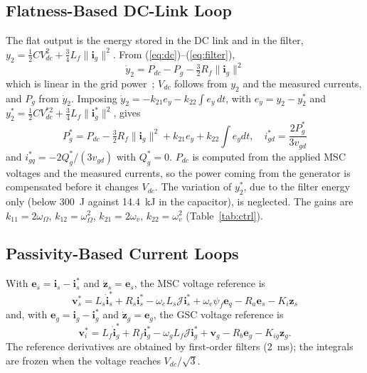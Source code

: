 \documentclass[conference]{IEEEtran}
\newcommand{\bv}[1]{\mathbf{#1}}
\newcommand{\Jm}{\boldsymbol{\mathcal{J}}}
\begin{document}
\subsection{Flatness-Based DC-Link Loop}
The flat output is the energy stored in the DC link and in the filter,
$y_2=\frac12CV_{dc}^2+\frac34L_f\|\bv{i}_g\|^2$. From (\ref{eq:dc})--(\ref{eq:filter}),
\begin{equation}
\dot y_2 = P_{dc} - P_g - \tfrac32R_f\|\bv{i}_g\|^2
\label{eq:y2}
\end{equation}
which is linear in the grid power~\cite{thounthong2010}; $V_{dc}$ follows from $y_2$ and the measured
currents, and $P_g$ from $\dot y_2$. Imposing $\dot y_2=-k_{21}e_y-k_{22}\int e_y\,dt$, with
$e_y=y_2-y_2^*$ and $y_2^*=\frac12CV_{dc}^{*2}+\frac34L_f\|\bv{i}_g^*\|^2$, gives
\begin{equation}
P_g^* = P_{dc} - \tfrac32R_f\|\bv{i}_g\|^2 + k_{21}e_y + k_{22}\!\int\! e_y dt,\quad
i_{gd}^*=\frac{2P_g^*}{3v_{gd}}
\label{eq:flat2}
\end{equation}
and $i_{gq}^*=-2Q_g^*/(3v_{gd})$ with $Q_g^*=0$. $P_{dc}$ is computed from the applied MSC voltages and
the measured currents, so the power coming from the generator is compensated before it changes
$V_{dc}$. The variation of $y_2^*$, due to the filter energy only (below 300~J against 14.4~kJ in the
capacitor), is neglected. The gains are $k_{11}=2\omega_\Omega$, $k_{12}=\omega_\Omega^2$,
$k_{21}=2\omega_v$, $k_{22}=\omega_v^2$ (Table~\ref{tab:ctrl}).

\subsection{Passivity-Based Current Loops}
With $\bv{e}_s=\bv{i}_s-\bv{i}_s^*$ and $\dot{\bv{z}}_s=\bv{e}_s$, the MSC voltage reference is
\begin{equation}
\bv{v}_s^* = L_s\dot{\bv{i}}_s^* + R_s\bv{i}_s^* - \omega_eL_s\Jm\bv{i}_s^* + \omega_e\psi_f\bv{e}_q
- R_a\bv{e}_s - K_i\bv{z}_s
\label{eq:pbc1}
\end{equation}
and, with $\bv{e}_g=\bv{i}_g-\bv{i}_g^*$ and $\dot{\bv{z}}_g=\bv{e}_g$, the GSC voltage reference is
\begin{equation}
\bv{v}_i^* = L_f\dot{\bv{i}}_g^* + R_f\bv{i}_g^* - \omega_gL_f\Jm\bv{i}_g^* + \bv{v}_g
- R_b\bv{e}_g - K_{ig}\bv{z}_g .
\label{eq:pbc2}
\end{equation}
The reference derivatives are obtained by first-order filters (2~ms); the integrals are frozen when the
voltage reaches $V_{dc}/\sqrt3$.
\end{document}
